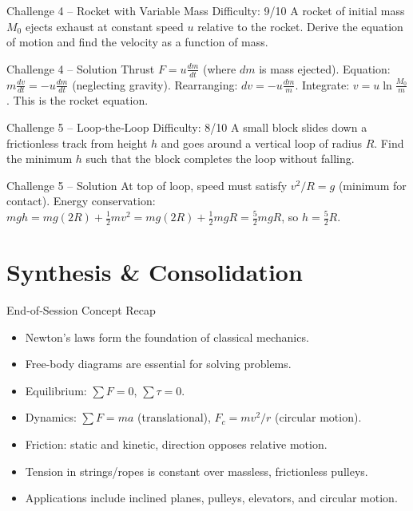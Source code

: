 \documentclass[11pt]{beamer}
\begin{document}
\begin{frame}[shrink=15]{Challenge 4 – Rocket with Variable Mass \hfill Difficulty: 9/10}
A rocket of initial mass $M_0$ ejects exhaust at constant speed $u$ relative to the rocket. Derive the equation of motion and find the velocity as a function of mass.
\end{frame}

\begin{frame}{Challenge 4 – Solution}
Thrust $F = u \frac{dm}{dt}$ (where $dm$ is mass ejected). Equation: $m \frac{dv}{dt} = -u \frac{dm}{dt}$ (neglecting gravity). Rearranging: $dv = -u \frac{dm}{m}$. Integrate: $v = u \ln\frac{M_0}{m}$. This is the rocket equation.
\end{frame}

\begin{frame}[shrink=15]{Challenge 5 – Loop‑the‑Loop \hfill Difficulty: 8/10}
A small block slides down a frictionless track from height $h$ and goes around a vertical loop of radius $R$. Find the minimum $h$ such that the block completes the loop without falling.
\end{frame}

\begin{frame}{Challenge 5 – Solution}
At top of loop, speed must satisfy $v^2/R = g$ (minimum for contact). Energy conservation: $mgh = mg(2R) + \frac12 m v^2 = mg(2R) + \frac12 m gR = \frac52 mgR$, so $h = \frac52 R$.
\end{frame}

\section{Synthesis \& Consolidation}

\begin{frame}{End‑of‑Session Concept Recap}
\begin{itemize}
    \item Newton's laws form the foundation of classical mechanics.
    \item Free-body diagrams are essential for solving problems.
    \item Equilibrium: $\sum F = 0$, $\sum \tau = 0$.
    \item Dynamics: $\sum F = ma$ (translational), $F_c = mv^2/r$ (circular motion).
    \item Friction: static and kinetic, direction opposes relative motion.
    \item Tension in strings/ropes is constant over massless, frictionless pulleys.
    \item Applications include inclined planes, pulleys, elevators, and circular motion.
\end{itemize}
\end{frame}
\end{document}
